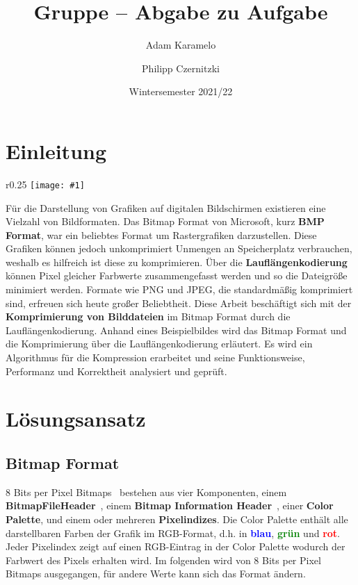 \documentclass[course=erap]{aspdoc}
\author{Adam Karamelo \and Philipp Czernitzki}
\date{Wintersemester 2021/22} %
\title{Gruppe \theGroup{} -- Abgabe zu Aufgabe \theNumber}
\newcommand{\imagewrap}[5]{
 \begin{wrapfigure}{#3}{#5}
  \vspace*{-5mm}
    \centering
   \texttt{[image: \#1]}
   \caption{#2}
 \end{wrapfigure}
}
\begin{document}
\maketitle

\section{Einleitung}
\imagewrap{example.png}{Rastergrafik 5x5}{r}{0.20\textwidth}{0.25\textwidth}
Für die Darstellung von Grafiken auf digitalen Bildschirmen existieren eine Vielzahl von Bildformaten. Das Bitmap Format von Microsoft, kurz \textbf{BMP Format}, war ein beliebtes Format um Rastergrafiken darzustellen.  Diese Grafiken können jedoch unkomprimiert Unmengen an Speicherplatz verbrauchen, weshalb es hilfreich ist diese zu komprimieren. Über die \textbf{Lauflängenkodierung} können Pixel gleicher Farbwerte zusammengefasst werden und so die Dateigröße minimiert werden. Formate wie PNG und JPEG, die standardmäßig komprimiert sind, erfreuen sich heute großer Beliebtheit. Diese Arbeit beschäftigt sich mit der \textbf{Komprimierung von Bilddateien} im Bitmap Format durch die Lauflängenkodierung. Anhand eines Beispielbildes wird das Bitmap Format und die Komprimierung über die Lauflängenkodierung erläutert. Es wird ein Algorithmus für die Kompression erarbeitet und seine Funktionsweise, Performanz und Korrektheit analysiert und geprüft.



\section{Lösungsansatz}

\subsection{Bitmap Format}
8 Bits per Pixel Bitmaps~\cite{aboutBitmaps} bestehen aus vier Komponenten, einem \textbf{BitmapFileHeader}~\cite{bitmapFileHeader}, einem \textbf{Bitmap Information Header}~\cite{bitmapHeaderTypes}, einer \textbf{Color Palette}, und einem oder mehreren \textbf{Pixelindizes}. Die Color Palette enthält  alle darstellbaren Farben der Grafik im RGB-Format, d.h. in \textbf{\textcolor{blue}{blau}}, \textbf{\textcolor{green}{grün}} und \textbf{\textcolor{red}{rot}}. Jeder Pixelindex zeigt auf einen RGB-Eintrag in der Color Palette wodurch der Farbwert des Pixels erhalten wird. Im folgenden wird von 8 Bits per Pixel Bitmaps ausgegangen, für andere Werte kann sich das Format ändern.
\end{document}
